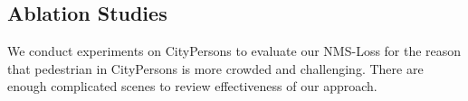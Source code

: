 \documentclass[sigconf]{acmart}
\begin{document}
\begin{table}[t]
\setlength{\abovecaptionskip}{2mm}
\setlength{\belowcaptionskip}{2mm}
\caption{\textbf{Comparison of our NMS-Ped with the baseline on CityPersons}.}
\vspace{-1mm}
\begin{center}
\end{center}
\vspace{-2mm}
\label{table_ablation_baseline_compare}
\end{table}

\begin{table}[t]
\setlength{\abovecaptionskip}{2mm}
\setlength{\belowcaptionskip}{2mm}
\caption{\textbf{Comparison on different thresholds $N_{t}$ of NMS-Loss on CityPersons}.}
\vspace{-1mm}
\begin{center}
\end{center}
\vspace{-2mm}
\label{table_threshold_compared}
\end{table}

\subsection{Ablation Studies}
We conduct experiments on CityPersons to evaluate our NMS-Loss for the reason that pedestrian in CityPersons is more crowded and challenging. There are enough complicated scenes to review effectiveness of our approach.
\end{document}
